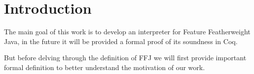 \chapter{Introduction}

The main goal of this work is to develop an interpreter for Feature
Featherweight Java, in the future it will be provided a formal proof of its
soundness in Coq.

But before delving through the definition of FFJ we will first provide
important formal definition to better understand the motivation of our work.

